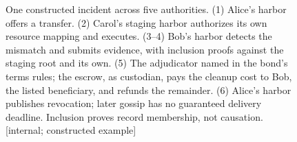 \begin{figure}[H]
\begin{tikzpicture}[pd figure,x=1cm,y=1cm]
\end{tikzpicture}
\caption{One constructed incident across five authorities.
(1) Alice's harbor offers a transfer. (2) Carol's staging harbor authorizes
its own resource mapping and executes. (3--4) Bob's harbor detects the mismatch
and submits evidence, with
inclusion proofs against the staging root and its own. (5) The adjudicator
named in the bond's terms rules; the escrow, as custodian, pays the cleanup
cost to Bob, the listed beneficiary, and refunds the remainder. (6) Alice's harbor publishes revocation; later gossip
has no guaranteed delivery deadline. Inclusion proves record membership,
not causation. [internal; constructed example]}
\label{fig:fh-worked-example}
\end{figure}

